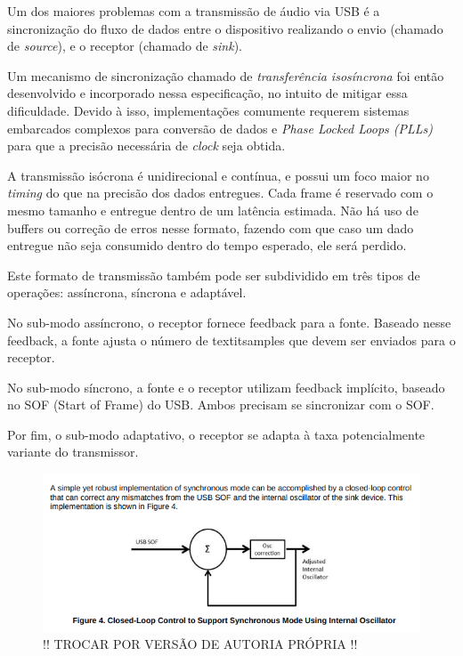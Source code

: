 Um dos maiores problemas com a transmissão de áudio via USB é a sincronização do fluxo de dados entre o dispositivo realizando o envio (chamado de \textit{source}), e o receptor (chamado de \textit{sink}). 

Um mecanismo de sincronização chamado de \textit{transferência isosíncrona} foi então desenvolvido e incorporado nessa especificação, no intuito de mitigar essa dificuldade. Devido à isso, implementações comumente requerem sistemas embarcados complexos para conversão de dados e \textit{Phase Locked Loops (PLLs)} para que a precisão necessária de \textit{clock} seja obtida. 

A transmissão isócrona é unidirecional e contínua, e possui um foco maior no \textit{timing} do que na precisão dos dados entregues. Cada frame é reservado com o mesmo tamanho e entregue dentro de um latência estimada. Não há uso de buffers ou correção de erros nesse formato, fazendo com que caso um dado entregue não seja consumido dentro do tempo esperado, ele será perdido. 

Este formato de transmissão também pode ser subdividido em três tipos de operações: assíncrona, síncrona e adaptável.

No sub-modo assíncrono, o receptor fornece feedback para a fonte. Baseado nesse feedback, a fonte ajusta o número de textit{samples} que devem ser enviados para o receptor.

No sub-modo síncrono, a fonte e o receptor utilizam feedback implícito, baseado no SOF (Start of Frame) do USB. Ambos precisam se sincronizar com o SOF.

Por fim, o sub-modo adaptativo, o receptor se adapta à taxa potencialmente variante do transmissor. 



\begin{figure}[!h]
  \includegraphics[scale=0.5]{figuras/synchronousmode.png}
  \caption{!! TROCAR POR VERSÃO DE AUTORIA PRÓPRIA !!}
  \label{fig:synchronousMode}
\end{figure}



